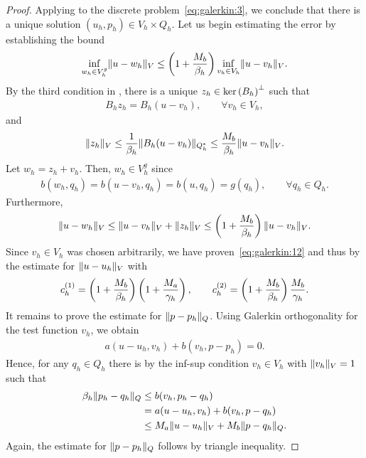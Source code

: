 \begin{proof}
  Applying  to the discrete
  problem~\eqref{eq:galerkin:3}, we conclude that there is a unique
  solution $(u_h,p_h)\in V_h\times Q_h$. Let us begin estimating the
  error by establishing the bound
  \begin{gather}
    \label{eq:galerkin:12}
    \inf_{w_h\in V_h^g} \lVert u-w_h\rVert_V
    \le \left(1+\frac{M_b}{\beta_h}\right)
    \inf_{v_h\in V_h} \lVert u-v_h\rVert_V.
  \end{gather}
  By the third condition in
  , there is a unique
  $z_h\in {\operatorname{ker}\left(B_h\right)}^\perp$ such that
  \begin{gather}
    B_h z_h = B_h(u-v_h),\qquad \forall v_h\in V_h,
  \end{gather}
  and
  \begin{gather}
    \lVert z_h\rVert_V \le \frac1{\beta_h}\lVert B_h(u-v_h)\rVert_{Q_h^*}
    \le\frac{M_b}{\beta_h} \lVert u-v_h\rVert_V.
  \end{gather}
  Let $w_h = z_h+v_h$. Then, $w_h\in V_h^g$ since
  \begin{gather}
    b(w_h, q_h) = b(u-v_h, q_h) = b(u, q_h) = g(q_h),
    \qquad\forall q_h\in Q_h.
  \end{gather}
  Furthermore,
  \begin{gather}
    \lVert u-w_h\rVert_V \le \lVert u-v_h\rVert_V + \lVert z_h\rVert_V
    \le \left(1+\frac{M_b}{\beta_h}\right)
    \lVert u-v_h\rVert_V.
  \end{gather}
  Since $v_h \in V_h$ was chosen arbitrarily, we have
  proven~\eqref{eq:galerkin:12} and thus by
   the estimate for
  $\lVert u-u_h\rVert_V$ with
  \begin{gather}
    c_h^{(1)} = \left(1+\frac{M_b}{\beta_h}\right)
    \left(1+\frac{M_a}{\gamma_h}\right),
    \qquad
    c_h^{(2)} = \left(1+\frac{M_b}{\beta_h}\right)
    \frac{M_b}{\gamma_h}.
  \end{gather}
  It remains to prove the estimate for $\lVert p-p_h\rVert_Q$. Using Galerkin
  orthogonality for the test function $v_h$, we obtain
  \begin{gather}
    \label{eq:galerkin:13}
    a(u-u_h, v_h) + b(v_h, p-p_h) = 0.
  \end{gather}
  Hence, for any $q_h\in Q_h$ there is by the inf-sup condition
  $v_h\in V_h$ with $\lVert v_h\rVert_V=1$ such that
  \begin{align}
    \beta_h \lVert p_h-q_h\rVert_Q
    &\le b(v_h, p_h-q_h)\\
    & = a(u-u_h, v_h) + b(v_h, p-q_h)\\
    &\le M_a \lVert u-u_h\rVert_V + M_b \lVert p-q_h\rVert_Q.
  \end{align}
  Again, the estimate for $\lVert p-p_h\rVert_Q$ follows by triangle
  inequality.
\end{proof}

